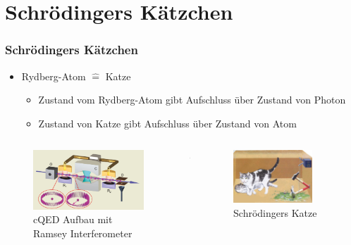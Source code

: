\documentclass{beamer}
\begin{document}
\section{Schrödingers Kätzchen}
\begin{frame}
	\frametitle{Schrödingers Kätzchen}
	\begin{itemize}
		\item Rydberg-Atom $\hat{=}$ Katze
		      \begin{itemize}
			      \item Zustand vom Rydberg-Atom gibt Aufschluss über Zustand von Photon
			      \item Zustand von Katze gibt Aufschluss über Zustand von Atom
		      \end{itemize}
	\end{itemize}
	\begin{columns}
		\begin{column}{0.45\textwidth}
			\begin{figure}
				\center\includegraphics[width=1\textwidth]{images/aufbau.png}
				\caption{cQED Aufbau mit Ramsey Interferometer\cite{lect}}
			\end{figure}
		\end{column}
		\begin{column}{0.1\textwidth}
			\center$\Leftrightarrow$
		\end{column}
		\begin{column}{0.45\textwidth}
			\begin{figure}
				\center\includegraphics[width=0.8\textwidth]{scat.png}
				\caption{Schrödingers Katze\cite{lect}}
			\end{figure}
		\end{column}
	\end{columns}

\end{frame}
\end{document}
